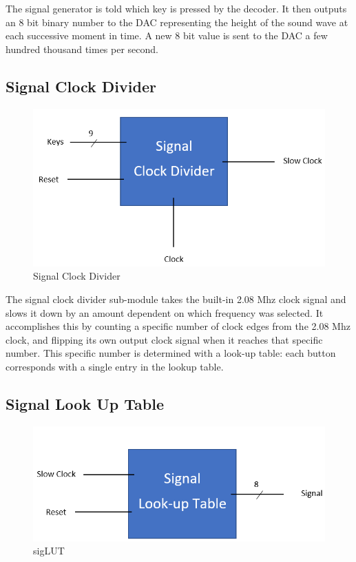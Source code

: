 \documentclass[a4paper]{article}
\begin{document}
The signal generator is told which key is pressed by the decoder. It then outputs an 8 bit binary number to the DAC representing the height of the sound wave at each successive moment in time. A new 8 bit value is sent to the DAC a few hundred thousand times per second.


\subsection{Signal Clock Divider}

\begin{figure}[h]
    \includegraphics[width=6 in]{./Images/chasePictures/SignalClockDivider.PNG}
    \caption{Signal Clock Divider}
    \label{fig:13}
\end{figure}

The signal clock divider sub-module takes the built-in 2.08 Mhz clock signal and slows it down by an amount dependent on which frequency was selected. It accomplishes this by counting a specific number of clock edges from the 2.08 Mhz clock, and flipping its own output clock signal when it reaches that specific number.
\newline\newline
This specific number is determined with a look-up table: each button corresponds with a single entry in the lookup table.


\subsection{Signal Look Up Table}

\begin{figure}[h]
    \includegraphics[width=6 in]{./Images/chasePictures/SIgnalLUT.PNG}
    \caption{sigLUT}
    \label{fig:14}
\end{figure}
\end{document}
